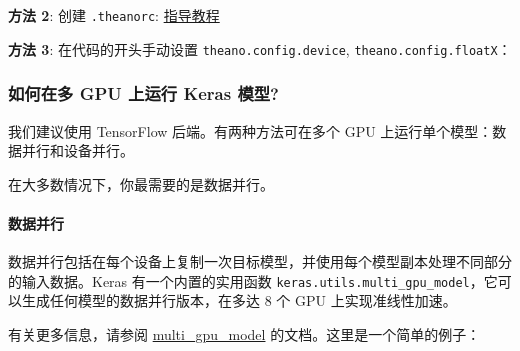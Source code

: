 \textbf{方法 2}: 创建 \texttt{.theanorc}:
\href{http://deeplearning.net/software/theano/library/config.html}{指导教程}

\textbf{方法 3}: 在代码的开头手动设置 \texttt{theano.config.device},
\texttt{theano.config.floatX}：

\begin{Shaded}
\begin{Highlighting}[]
 
\OperatorTok{=} 
\OperatorTok{=} 
\end{Highlighting}
\end{Shaded}



\subsubsection{如何在多 GPU 上运行 Keras
模型?}\label{how-can-i-run-a-keras-model-on-multiple-gpus}

我们建议使用 TensorFlow 后端。有两种方法可在多个 GPU
上运行单个模型：数据并行和设备并行。

在大多数情况下，你最需要的是数据并行。

\paragraph{数据并行}\label{ux6570ux636eux5e76ux884c}

数据并行包括在每个设备上复制一次目标模型，并使用每个模型副本处理不同部分的输入数据。Keras
有一个内置的实用函数
\texttt{keras.utils.multi\_gpu\_model}，它可以生成任何模型的数据并行版本，在多达
8 个 GPU 上实现准线性加速。

有关更多信息，请参阅 \hyperref[multi-gpu-model]{multi\_gpu\_model}
的文档。这里是一个简单的例子：

\begin{Shaded}
\begin{Highlighting}[]
  

\OperatorTok{=} \OperatorTok{=}\NormalTok{)}
\OperatorTok{=}\NormalTok{,}
                       \OperatorTok{=}\NormalTok{)}

\OperatorTok{=}\OperatorTok{=}\NormalTok{)}
\end{Highlighting}
\end{Shaded}

